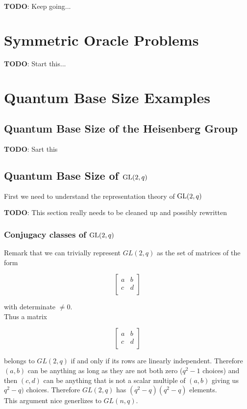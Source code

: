 \documentclass[12pt,twoside]{reedthesis}
\theoremstyle{definition}\newtheorem{definition}{Definition}
\theoremstyle{definition}\newtheorem{example}{Example}
\newcommand{\TODO}[1]{{ \color{red} \textbf{TODO}: {#1}}}
\begin{document}
\TODO{Keep going...}


\chapter{Symmetric Oracle Problems}
\TODO{Start this...}


\chapter{Quantum Base Size Examples}

\section{Quantum Base Size of the Heisenberg Group}
\TODO{Sart this}

\section{Quantum Base Size of $\operatorname{GL}(2, q)$}
First we need to understand the representation theory of $\operatorname{GL}(2,q)$

\TODO{This section really needs to be cleaned up and possibly rewritten}
\subsection{Conjugacy classes of $\operatorname{GL}(2,q)$}


Remark that we can trivially represent $GL(2,q) $ as the set of matrices of the form

$$ \begin{bmatrix}
a&b\\
c&d\\
\end{bmatrix}
$$

with determinate $\neq{0}$.\\

Thus a matrix

$$ \begin{bmatrix}
a&b\\
c&d\\
\end{bmatrix}
$$

belongs to $GL(2,q) $ if and only if its rows are linearly independent.  Therefore $(a,b)$ can be anything as long as they are not both zero ($q^2 -1$ choices) and then $(c,d)$ can be anything 
that is not a scalar multiple of $(a,b)$ giving us $q^2-q)$ choices.
Therefore $GL(2,q) $ has $(q^2-q)(q^2-q)$ elements.\\
This argument nice generlizes to $GL(n,q)$.
\end{document}
